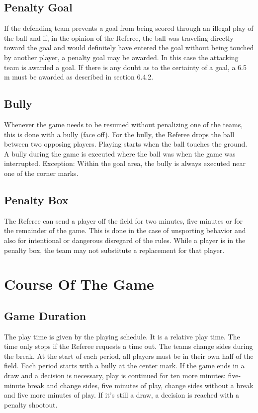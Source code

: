 \subsection{Penalty Goal}
If the defending team prevents a goal from being scored through an illegal play of the ball and if, in the opinion of the
Referee, the ball was traveling directly toward the goal and would definitely have entered the goal without being
touched by another player, a penalty goal may be awarded. In this case the attacking team is awarded a goal. If there is
any doubt as to the certainty of a goal, a 6.5 m must be awarded as described in section 6.4.2.

\subsection{Bully}
Whenever the game needs to be resumed without penalizing one of the teams, this is done with a bully (face off). For
the bully, the Referee drops the ball between two opposing players. Playing starts when the ball touches the ground. A
bully during the game is executed where the ball was when the game was interrupted. Exception: Within the goal area,
the bully is always executed near one of the corner marks.

\subsection{Penalty Box}
The Referee can send a player off the field for two minutes, five minutes or for the remainder of the game. This is done
in the case of unsporting behavior and also for intentional or dangerous disregard of the rules. While a player is in the
penalty box, the team may not substitute a replacement for that player.

\section{Course Of The Game}

\subsection{Game Duration}
The play time is given by the playing schedule. It is a relative play time. The time only stops if the Referee requests a
time out. The teams change sides during the break. At the start of each period, all players must be in their own half of
the field. Each period starts with a bully at the center mark. If the game ends in a draw and a decision is necessary, play
is continued for ten more minutes: five-minute break and change sides, five minutes of play, change sides without a
break and five more minutes of play. If it’s still a draw, a decision is reached with a penalty shootout.


